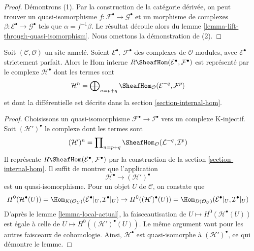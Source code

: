 \begin{proof}
Démontrons (1). Par la construction de la catégorie dérivée, on peut trouver
un quasi-isomorphisme
$f : \mathcal{F}^\bullet \to \mathcal{G}^\bullet$ et un morphisme de
complexes $\beta : \mathcal{E}^\bullet \to \mathcal{G}^\bullet$ tels que
$\alpha = f^{-1}\beta$. Le résultat découle alors du lemme
\ref{lemma-lift-through-quasi-isomorphism}. Nous omettons la démonstration de
(2).
\end{proof}

\begin{lemma}
\label{lemma-Rhom-strictly-perfect}
Soit $(\mathcal{C}, \mathcal{O})$ un site annelé. Soient
$\mathcal{E}^\bullet$, $\mathcal{F}^\bullet$ des complexes de
$\mathcal{O}$-modules, avec $\mathcal{E}^\bullet$ strictement parfait. Alors le
Hom interne $R\SheafHom(\mathcal{E}^\bullet, \mathcal{F}^\bullet)$ est
représenté par le complexe $\mathcal{H}^\bullet$ dont les termes sont
$$
\mathcal{H}^n =
\bigoplus\nolimits_{n = p + q}
\SheafHom_\mathcal{O}(\mathcal{E}^{-q}, \mathcal{F}^p)
$$
et dont la différentielle est décrite dans la section
\ref{section-internal-hom}.
\end{lemma}

\begin{proof}
Choisissons un quasi-isomorphisme
$\mathcal{F}^\bullet \to \mathcal{I}^\bullet$ vers un complexe K-injectif.
Soit $(\mathcal{H}')^\bullet$ le complexe dont les termes sont
$$
(\mathcal{H}')^n =
\prod\nolimits_{n = p + q}
\SheafHom_\mathcal{O}(\mathcal{L}^{-q}, \mathcal{I}^p)
$$
Il représente $R\SheafHom(\mathcal{E}^\bullet, \mathcal{F}^\bullet)$ par la
construction de la section \ref{section-internal-hom}. Il suffit de montrer
que l'application
$$
\mathcal{H}^\bullet \longrightarrow (\mathcal{H}')^\bullet
$$
est un quasi-isomorphisme. Pour un objet $U$ de $\mathcal{C}$, on constate que
$$
H^0(\mathcal{H}^\bullet(U)) =
\Hom_{K(\mathcal{O}_U)}(\mathcal{E}^\bullet|_U, \mathcal{I}^\bullet|_U)
\to
H^0((\mathcal{H}')^\bullet(U)) =
\Hom_{D(\mathcal{O}_U)}(\mathcal{E}^\bullet|_U, \mathcal{I}^\bullet|_U)
$$
D'après le lemme \ref{lemma-local-actual}, la faisceautisation de
$U \mapsto H^0(\mathcal{H}^\bullet(U))$ est égale à celle de
$U \mapsto H^0((\mathcal{H}')^\bullet(U))$. Le même argument vaut pour les
autres faisceaux de cohomologie. Ainsi, $\mathcal{H}^\bullet$ est
quasi-isomorphe à $(\mathcal{H}')^\bullet$, ce qui démontre le lemme.
\end{proof}

